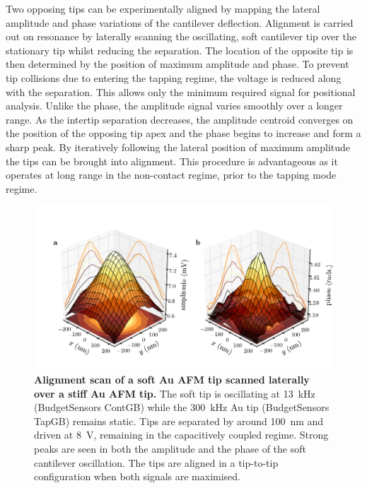 \documentclass{article}
\begin{document}
Two opposing tips can be experimentally aligned by mapping the lateral amplitude and phase variations of the cantilever deflection. Alignment is carried out on resonance by laterally scanning the oscillating, soft cantilever tip over the stationary tip whilst reducing the separation. The location of the opposite tip is then determined by the position of maximum amplitude and phase. To prevent tip collisions due to entering the tapping regime, the voltage is reduced along with the separation. This allows only the minimum required signal for positional analysis. Unlike the phase, the amplitude signal varies smoothly over a longer range. As the intertip separation decreases, the amplitude centroid converges on the position of the opposing tip apex and the phase begins to increase and form a sharp peak.  By iteratively following the lateral position of maximum amplitude the tips can be brought into alignment. This procedure is advantageous as it operates at long range in the non-contact regime, prior to the tapping mode regime.

\begin{figure}[bt]
\centering
\includegraphics[clip=true, trim=27 19 0 33]{figures/alignment_scan}
\caption[Alignment scan of a soft Au AFM tip scanned laterally over a stiff Au AFM tip]{\textbf{Alignment scan of a soft Au AFM tip scanned laterally over a stiff Au AFM tip.} The soft tip is oscillating at \SI{13}{kHz} (BudgetSensors ContGB) while the \SI{300}{kHz} Au tip (BudgetSensors TapGB) remains static. Tips are separated by around \SI{100}{nm} and driven at \SI{8}{V}, remaining in the capacitively coupled regime. Strong peaks are seen in both the amplitude and the phase of the soft cantilever oscillation. The tips are aligned in a tip-to-tip configuration when both signals are maximised.}
\label{fig:alignment_scan} 
\end{figure}
\end{document}
